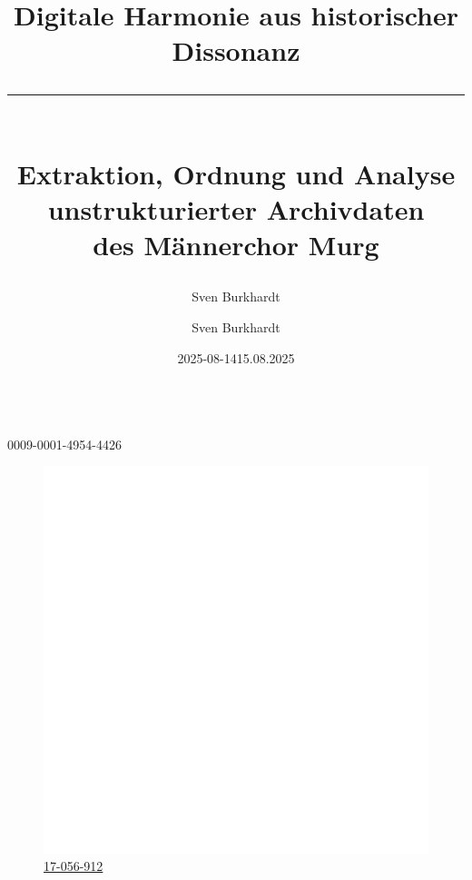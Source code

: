 \documentclass[12pt, a4paper, ngerman, bidi=default]{article}
\title{\vspace*{4cm} \LARGE Digitale Harmonie aus historischer Dissonanz
\color{UniMint} \rule{8cm}{1pt} \\  
\vspace{0.2cm}  
\color{white}\large Extraktion, Ordnung und Analyse\\unstrukturierter Archivdaten\\des Männerchor Murg}
\subtitle{}
\author{Sven Burkhardt}
\date{2025-08-14} %
\begin{document}
\begin{titlepage}
    
\color{white}
\pagecolor[HTML]{46505A} %
\date{}
\author{}
\maketitle
\begin{center}
  \author{\LARGE{\author{\vspace{-0.5cm}Sven Burkhardt}}}\\
  \vspace{4mm}
  \large{ {0009-0001-4954-4426}}\\ %
  \begin{figure}[h]
    \centering
    \color{white}
    \large{\href{https://dhlab.philhist.unibas.ch/en/persons/sven-burkhardt/}{{\hspace*{0.5mm}\includegraphics[height=4.5
  mm]{./assets/Logos/Uni_basel_logo_white.png}}\hspace{3.4mm}\color{white} 17-056-912}}\\ %
    \date{\hspace*{2mm}15.08.2025}%
  \end{figure}
  \setcounter{figure}{0}
\end{center}



\end{titlepage}
\end{document}

